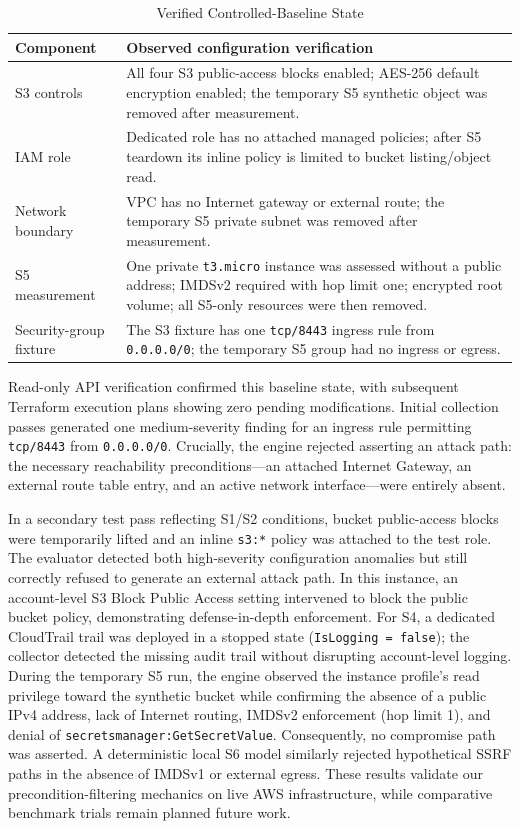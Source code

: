 \documentclass[conference]{IEEEtran}
\begin{document}
\begin{table}[t]
\caption{Verified Controlled-Baseline State}
\label{tab:baseline}
\centering
\footnotesize
\begin{tabular}{p{} p{}}
\toprule
Component & Observed configuration verification \\
\midrule
S3 controls & All four S3 public-access blocks enabled; AES-256 default encryption enabled; the temporary S5 synthetic object was removed after measurement. \\
IAM role & Dedicated role has no attached managed policies; after S5 teardown its inline policy is limited to bucket listing/object read. \\
Network boundary & VPC has no Internet gateway or external route; the temporary S5 private subnet was removed after measurement. \\
S5 measurement & One private \texttt{t3.micro} instance was assessed without a public address; IMDSv2 required with hop limit one; encrypted root volume; all S5-only resources were then removed. \\
Security-group fixture & The S3 fixture has one \texttt{tcp/8443} ingress rule from \texttt{0.0.0.0/0}; the temporary S5 group had no ingress or egress. \\
\bottomrule
\end{tabular}
\end{table}

Read-only API verification confirmed this baseline state, with subsequent Terraform execution plans showing zero pending modifications. Initial collection passes generated one medium-severity finding for an ingress rule permitting \texttt{tcp/8443} from \texttt{0.0.0.0/0}. Crucially, the engine rejected asserting an attack path: the necessary reachability preconditions—an attached Internet Gateway, an external route table entry, and an active network interface—were entirely absent.

In a secondary test pass reflecting S1/S2 conditions, bucket public-access blocks were temporarily lifted and an inline \texttt{s3:*} policy was attached to the test role. The evaluator detected both high-severity configuration anomalies but still correctly refused to generate an external attack path. In this instance, an account-level S3 Block Public Access setting intervened to block the public bucket policy, demonstrating defense-in-depth enforcement. For S4, a dedicated CloudTrail trail was deployed in a stopped state (\texttt{IsLogging = false}); the collector detected the missing audit trail without disrupting account-level logging. During the temporary S5 run, the engine observed the instance profile's read privilege toward the synthetic bucket while confirming the absence of a public IPv4 address, lack of Internet routing, IMDSv2 enforcement (hop limit 1), and denial of \texttt{secretsmanager:GetSecretValue}. Consequently, no compromise path was asserted. A deterministic local S6 model similarly rejected hypothetical SSRF paths in the absence of IMDSv1 or external egress. These results validate our precondition-filtering mechanics on live AWS infrastructure, while comparative benchmark trials remain planned future work.
\end{document}
